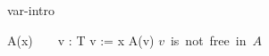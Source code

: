 \begin{circuslaw}{var-intro}
\begin{circusaction*}
  A(x) ~ \equiv ~ \circvar v : T \circspot v := x \circseq A(v)
  \also
  \provided \; \mbox{$v$ is not free in $A$}
\end{circusaction*}
\end{circuslaw}
